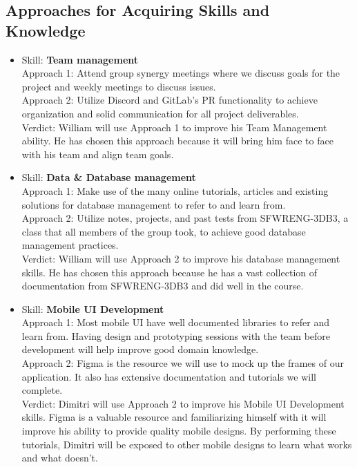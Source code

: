 \documentclass[12pt]{article}
\begin{document}
	\subsection{Approaches for Acquiring Skills and Knowledge}
	\begin{itemize}
		
		\item Skill: \textbf{Team management}
		\\ Approach 1: Attend group synergy meetings where we discuss goals for the project and weekly meetings to discuss issues.
		\\ Approach 2: Utilize Discord and GitLab's PR functionality to achieve organization and solid communication for all project deliverables.
		\\ Verdict: William will use Approach 1 to improve his Team Management ability. He has chosen this approach because it will bring him face to face with his team and align team goals.
		
		\item Skill: \textbf{Data \& Database management}
		\\ Approach 1: Make use of the many online tutorials, articles and existing solutions for database management to refer to and learn from.
		\\ Approach 2: Utilize notes, projects, and past tests from SFWRENG-3DB3, a class that all members of the group took, to achieve good database management practices.
		\\ Verdict: William will use Approach 2 to improve his database management skills. He has chosen this approach because he has a vast collection of documentation from SFWRENG-3DB3 and did well in the course.

		\item Skill: \textbf{Mobile UI Development}
		\\ Approach 1: Most mobile UI have well documented libraries to refer and learn from. Having design and prototyping sessions with the team before development will help improve good domain knowledge.
		\\ Approach 2: Figma is the resource we will use to mock up the frames of our application. It also has extensive documentation and tutorials we will complete.
		\\ Verdict: Dimitri will use Approach 2 to improve his Mobile UI Development skills. Figma is a valuable resource and familiarizing himself with it will improve his ability to provide quality mobile designs. By performing these tutorials, Dimitri will be exposed to other mobile designs to learn what works and what doesn't. 


\end{itemize}
\end{document}
